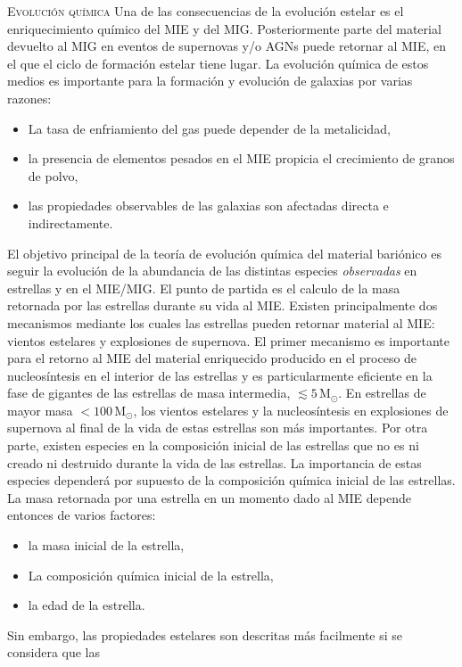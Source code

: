 \documentclass[xcolor=dvipsnames,4pt,hyperref={colorlinks,citecolor=black,linkcolor=black,urlcolor=black}]{beamer}
\begin{document}
\begin{frame}[allowframebreaks]{\textsc{Evolución química}}
%
Una de las consecuencias de la evolución estelar es el enriquecimiento químico del MIE y del MIG.
Posteriormente parte del material devuelto al MIG en eventos de supernovas y/o AGNs puede retornar
al MIE, en el que el ciclo de formación estelar tiene lugar. La evolución química de estos medios es
importante para la formación y evolución de galaxias por varias razones:
%
\begin{itemize}
\item La tasa de enfriamiento del gas puede depender de la metalicidad,
\item la presencia de elementos pesados en el MIE propicia el crecimiento de granos de polvo,
\item las propiedades observables de las galaxias son afectadas directa e indirectamente.
\end{itemize}
%
El objetivo principal de la teoría de evolución química del material bariónico es seguir la
evolución de la abundancia de las distintas especies \emph{observadas} en estrellas y en el MIE/MIG.
El punto de partida es el calculo de la masa retornada por las estrellas durante su vida al MIE.
Existen principalmente dos mecanismos mediante los cuales las estrellas pueden retornar material al
MIE: vientos estelares y explosiones de supernova. El primer mecanismo es importante para el retorno
al MIE del material enriquecido producido en el proceso de nucleosíntesis en el interior de las
estrellas y es particularmente eficiente en la fase de gigantes de las estrellas de masa intermedia,
$\lesssim5\,$M$_\odot$. En estrellas de mayor masa $<100\,$M$_\odot$, los vientos estelares y la
nucleosíntesis en explosiones de supernova al final de la vida de estas estrellas son más
importantes. Por otra parte, existen especies en la composición inicial de las estrellas que no es
ni creado ni destruido durante la vida de las estrellas. La importancia de estas especies dependerá
por supuesto de la composición química inicial de las estrellas. La masa retornada por una estrella
en un momento dado al MIE depende entonces de varios factores:
%
\begin{itemize}
\item la masa inicial de la estrella,
\item La composición química inicial de la estrella,
\item la edad de la estrella.
\end{itemize}
%
Sin embargo, las propiedades estelares son descritas más facilmente si se considera que las

\end{frame}
\end{document}
